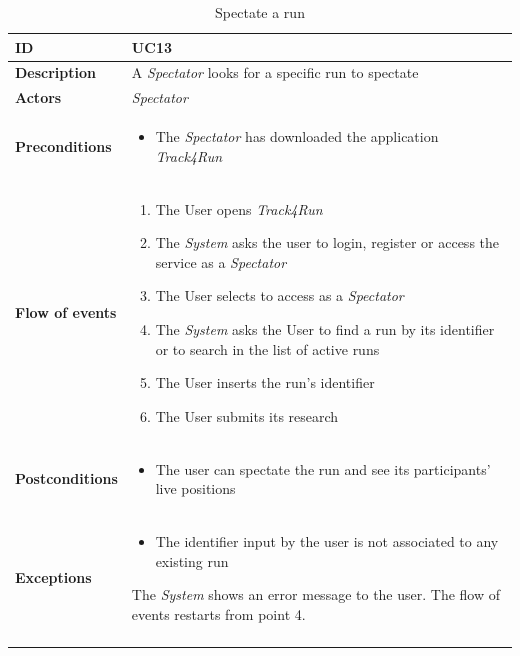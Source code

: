 \documentclass[titlepage]{article}
\begin{document}
 \begin{longtable}{| p{3 cm} | p{10 cm} |} 
			\hline
			{\bf ID} & UC13\\
			\hline
			{\bf Description} & A {\it Spectator} looks for a specific run to spectate  \\
			\hline
			{\bf Actors} & {\it {\it Spectator} }\\
			\hline
			{\bf Preconditions} & 		
							\begin{itemize}
								\item The {\it Spectator} has downloaded the application {\it Track4Run}
							\end{itemize}
			\\
			\hline
			{\bf Flow of events} & 
							\begin{enumerate}
								\item The User opens {\it Track4Run}
\item The {\it System} asks the user to login, register or access the service as a {\it Spectator}
\item The User selects to access as a {\it Spectator}
\item The {\it System} asks the User to find a run by its identifier or to search in the list of active runs
\item The User inserts the run’s identifier
\item The User submits its research
							\end{enumerate}			
			 \\
			\hline
			{\bf Postconditions} & 
							\begin{itemize}
								\item The user can spectate the run and see its participants’ live positions

							\end{itemize}
			\\
			\hline
			{\bf Exceptions} & 
							\begin{itemize}
								\item The identifier input by the user is not associated to any existing run
							\end{itemize}
							The {\it System} shows an error message to the user. The flow of events restarts from point 4.					
			\\
			\hline
			\caption{Spectate a run}
			\end{longtable}

		
\end{document}
